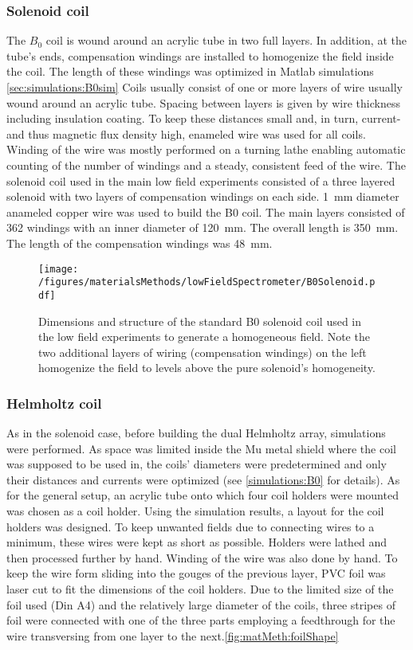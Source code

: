         \subsubsection{Solenoid coil}
            The $B_0$ coil is wound around an acrylic tube in two full layers. In addition, at the
            tube's ends, compensation windings are installed to homogenize the field inside the coil.
            The length of these windings was optimized in Matlab simulations \ref{sec:simulations:B0sim}
            Coils usually consist of one or more layers of wire usually wound around an acrylic tube. Spacing between layers is given by wire thickness including insulation coating. To keep  these distances small and, in turn, current- and thus magnetic flux density high, enameled wire was used for all coils. Winding of the wire was mostly performed on a turning lathe enabling automatic counting of the number of windings and a steady, consistent feed of the wire.
            The solenoid coil used in the main low field experiments consisted of a three layered solenoid with two layers of compensation windings on each side. \SI{1}{\mm} diameter anameled copper wire was used to build the B0 coil. The main layers consisted of 362 windings with an inner diameter of \SI{120}{\mm}. The overall length is \SI{350}{\milli\meter}. The length of the compensation windings was \SI{48}{\mm}.
            \begin{figure}
                \centering
                \texttt{[image: /figures/materialsMethods/lowFieldSpectrometer/B0Solenoid.pdf]}
                \caption[B0 coil layout]{Dimensions and structure of the standard B0 solenoid coil used in the low field experiments to generate a homogeneous field. Note the two additional layers of wiring (compensation windings) on the left homogenize the field to levels above the pure solenoid's homogeneity.}
                \label{fig:matMeth:b0Solenoid}
            \end{figure}
        \subsubsection{Helmholtz coil}
        \label{sec:matMeth:Helmholtz}
        As in the solenoid case, before building the dual Helmholtz array, simulations were performed.  As space was limited inside the Mu metal shield where the coil was supposed to be used in, the coils' diameters were predetermined and only their distances and currents were optimized (see \ref{simulations:B0} for details). As for the general setup, an acrylic tube onto which four coil holders were mounted was chosen as a coil holder. Using the simulation results, a layout for the coil holders was designed. To keep unwanted fields due to connecting wires to a minimum, these wires were kept as short as possible. Holders were lathed and then processed further by hand. Winding of the wire was also done by hand. To keep the wire form sliding into the gouges of the previous layer, PVC foil was laser cut to fit the dimensions of the coil holders. Due to the limited size of the foil used (Din A4) and the relatively large diameter of the coils, three stripes of foil were connected with one of the three parts employing a feedthrough for the wire transversing from one layer to the next.\ref{fig:matMeth:foilShape}
